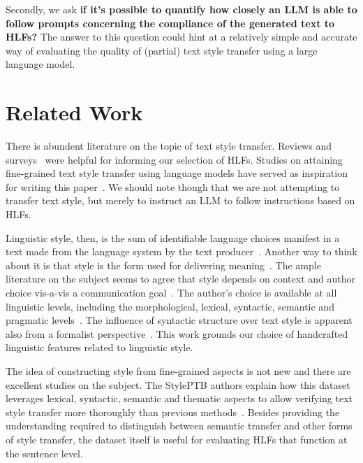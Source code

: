 \documentclass[runningheads,a4paper,11pt]{article}
\begin{document}
Secondly, we ask \textbf{if it's possible to quantify how closely an LLM is able
    to follow prompts concerning the compliance of the generated text to HLFs?}
The answer to this question could hint at a relatively simple and accurate way
of evaluating the quality of (partial) text style transfer using a large
language model.

\section{Related Work}\label{related}

There is abundent literature on the topic of text style transfer.
Reviews and surveys~\cite{tst-review-2021,tst-survey-2022} were helpful for
informing our selection of HLFs.
Studies on attaining fine-grained text style transfer using language models
have served as inspiration for writing this paper~\cite{lyu-etal-2023-fine}.
We should note though that we are not attempting to transfer text style, but
merely to instruct an LLM to follow instructions based on HLFs.

Linguistic style, then, is the sum of identifiable language choices manifest in
a text made from the language system by the text
producer~\cite{lugea2023stylistics}.
Another way to think about it is that style is the form used for delivering
meaning~\cite{tst_sigkdd_review_2022}.
The ample literature on the subject seems to agree that style depends on context
and author choice vis-a-vis a communication
goal~\cite{mcdonald1985computational,hovy1987generating}.
The author's choice is available at all linguistic levels, including the
morphological, lexical, syntactic, semantic and pragmatic
levels~\cite{dimarco1994model,lugea2023stylistics}.
The influence of syntactic structure over text style is apparent also from a
formalist perspective~\cite{chomsky2002syntactic}.
This work grounds our choice of handcrafted linguistic features related to
linguistic style.

The idea of constructing style from fine-grained aspects is not new and there
are excellent studies on the subject.
The StylePTB authors explain how this dataset leverages lexical, syntactic,
semantic and thematic aspects to allow verifying text style transfer more
thoroughly than previous methods~\cite{lyu-etal-2021-styleptb}.
Besides providing the understanding required to distinguish between semantic
transfer and other forms of style transfer, the dataset itself is useful for
evaluating HLFs that function at the sentence level.
\end{document}
